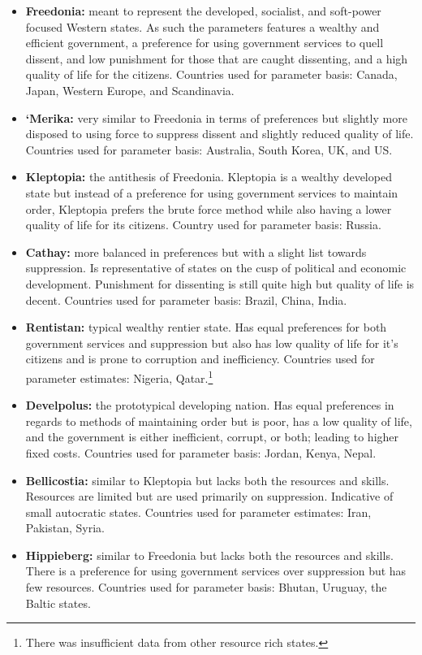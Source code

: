 \documentclass[12pt]{article}
\begin{document}
\begin{spacing}{1.5}
\begin{itemize}
	\item \textbf{Freedonia:} meant to represent the developed, socialist, and soft-power focused Western states. As such the parameters features a wealthy and efficient government, a preference for using government services to quell dissent, and low punishment for those that are caught dissenting, and a high quality of life for the citizens. Countries used for parameter basis: Canada, Japan, Western Europe, and Scandinavia. 
	\item \textbf{`Merika:} very similar to Freedonia in terms of preferences but slightly more disposed to using force to suppress dissent and slightly reduced quality of life.  Countries used for parameter basis: Australia, South Korea, UK, and US. 
	\item \textbf{Kleptopia:} the antithesis of Freedonia. Kleptopia is a wealthy developed state but instead of a preference for using government services to maintain order, Kleptopia prefers the brute force method while also having a lower quality of life for its citizens.  Country used for parameter basis: Russia.  
	\item \textbf{Cathay:} more balanced in preferences but with a slight list towards suppression. Is representative of states on the cusp of political and economic development. Punishment for dissenting is still quite high but quality of life is decent.  Countries used for parameter basis: Brazil, China, India.   
	\item \textbf{Rentistan:} typical wealthy rentier state. Has equal preferences for both government services and suppression but also has low quality of life for it's citizens and is prone to corruption and inefficiency.  Countries used for parameter estimates: Nigeria, Qatar.\footnote{There was insufficient data from other resource rich states.} 
	\item \textbf{Develpolus:} the prototypical developing nation. Has equal preferences in regards to methods of maintaining order but is poor, has a low quality of life, and the government is either inefficient, corrupt, or both; leading to higher fixed costs. Countries used for parameter basis: Jordan, Kenya, Nepal.  	
	\item \textbf{Bellicostia:} similar to Kleptopia but lacks both the resources and skills. Resources are limited but are used primarily on suppression. Indicative of small autocratic states.  Countries used for parameter estimates: Iran, Pakistan, Syria. 
	\item \textbf{Hippieberg:} similar to Freedonia but lacks both the resources and skills. There is a preference for using government services over suppression but has few resources. Countries used for parameter basis: Bhutan, Uruguay, the Baltic states.  
\end{itemize}


\end{spacing}
\end{document}
